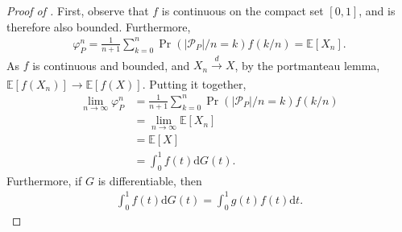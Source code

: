 \documentclass[a4paper]{article}
\newcommand{\dt}{\mathrm{d}t}
\newcommand{\dG}{\mathrm{d}G}
\newcommand{\E}{\mathbb{E}}
\begin{document}
\begin{proof}[Proof of ]
    First, observe that $f$ is continuous on the compact set $[0, 1]$, and is therefore also bounded.
    Furthermore,
    \begin{align*}
        \varphi_P^n = \frac{1}{n+1} \sum_{k=0}^n \Pr(|\mathcal{P}_P| / n = k) f(k/n) = \E[X_n].
    \end{align*}
    As $f$ is continuous and bounded, and $X_n \xrightarrow[]{d} X$, by the portmanteau lemma, $\E[f(X_n)] \to \E[f(X)]$.
    Putting it together,
    \begin{align*}
        \lim_{n \to \infty} \varphi_P^n &= \frac{1}{n+1} \sum_{k=0}^n \Pr(|\mathcal{P}_P| / n = k) f(k/n) \\
        &= \lim_{n \to \infty} \E[X_n] \\
        &= \E[X] \\
        &= \int_0^1 f(t) \dG(t).
    \end{align*}
    Furthermore, if $G$ is differentiable, then
    \begin{align*}
        \int_0^1 f(t) \dG(t) = \int_0^1 g(t) f(t) \dt.
    \end{align*}
\end{proof}
\end{document}
